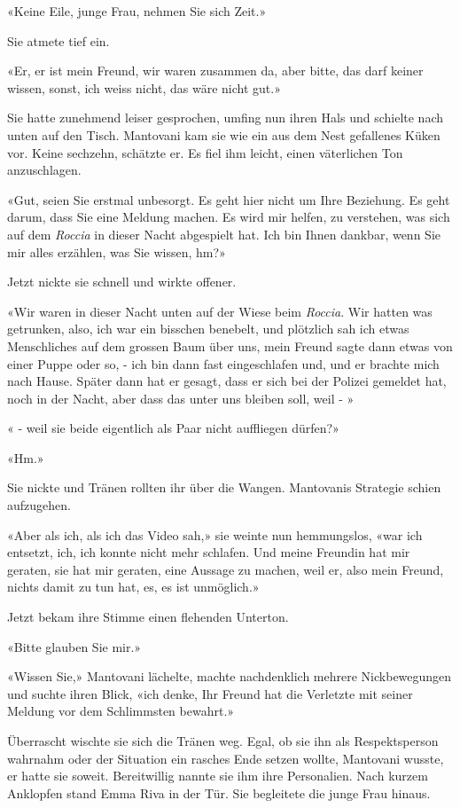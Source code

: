 «Keine Eile, junge Frau, nehmen Sie sich Zeit.»

Sie atmete tief ein.

«Er, er ist mein Freund, wir waren zusammen da, aber bitte, das darf
keiner wissen, sonst, ich weiss nicht, das wäre nicht gut.»

Sie hatte zunehmend leiser gesprochen, umfing nun ihren Hals und
schielte nach unten auf den Tisch. Mantovani kam sie wie ein aus dem
Nest gefallenes Küken vor. Keine sechzehn, schätzte er. Es fiel ihm
leicht, einen väterlichen Ton anzuschlagen.

«Gut, seien Sie erstmal unbesorgt. Es geht hier nicht um Ihre Beziehung.
Es geht darum, dass Sie eine Meldung machen. Es wird mir helfen, zu
verstehen, was sich auf dem \emph{Roccia} in dieser Nacht abgespielt hat. Ich bin Ihnen dankbar,
wenn Sie mir alles erzählen, was Sie wissen, hm?»

Jetzt nickte sie schnell und wirkte offener.

«Wir waren in dieser Nacht unten auf der Wiese beim \emph{Roccia}. Wir
hatten was getrunken, also, ich war ein bisschen benebelt, und
plötzlich sah ich etwas Menschliches auf dem grossen Baum über uns, mein
Freund sagte dann etwas von einer Puppe oder so, - ich bin dann fast  
eingeschlafen und, und er brachte mich nach Hause. Später dann hat er
gesagt, dass er sich bei der Polizei gemeldet hat, noch in der Nacht,
aber dass das unter uns bleiben soll, weil - »

« - weil sie beide eigentlich als Paar nicht auffliegen dürfen?»

«Hm.»

Sie nickte und Tränen rollten ihr über die Wangen.
Mantovanis Strategie schien aufzugehen.

«Aber als ich, als ich das Video sah,» sie weinte nun hemmungslos, «war ich
entsetzt, ich, ich konnte nicht mehr schlafen. Und meine Freundin hat mir geraten, sie hat mir geraten, eine
Aussage zu machen, weil er, also mein Freund, nichts damit zu tun hat, es, es ist
unmöglich.»

Jetzt bekam ihre Stimme einen flehenden Unterton.

«Bitte glauben Sie mir.»

«Wissen Sie,» Mantovani lächelte, machte nachdenklich mehrere
Nickbewegungen und suchte ihren Blick, «ich denke, Ihr Freund hat die
Verletzte mit seiner Meldung vor dem Schlimmsten bewahrt.»

Überrascht wischte sie sich die Tränen weg. 
Egal, ob sie ihn als Respektsperson wahrnahm 
oder der Situation ein rasches Ende setzen wollte, Mantovani  wusste, er hatte sie soweit. 
Bereitwillig nannte sie ihm ihre Personalien.
Nach kurzem Anklopfen stand Emma Riva in der Tür. Sie begleitete die
junge Frau hinaus.

